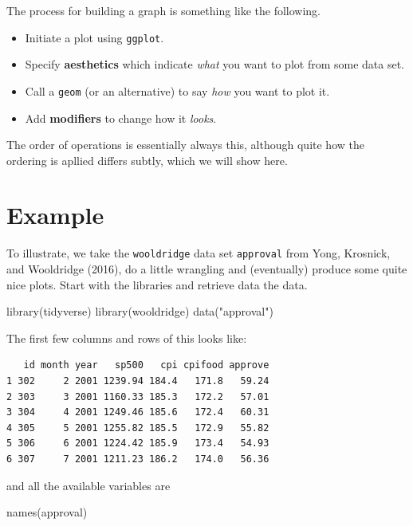 \documentclass[
  letterpaper,
]{book}
\newenvironment{Shaded}{\begin{snugshade}}{\end{snugshade}}
\newcommand{\FunctionTok}[1]{\textcolor[rgb]{0.28,0.35,0.67}{#1}}
\newcommand{\NormalTok}[1]{\textcolor[rgb]{0.00,0.23,0.31}{#1}}
\newcommand{\StringTok}[1]{\textcolor[rgb]{0.13,0.47,0.30}{#1}}
\providecommand{\tightlist}{%
  \setlength{\itemsep}{0pt}\setlength{\parskip}{0pt}}\usepackage{longtable,booktabs,array}
\begin{document}
The process for building a graph is something like the following.

\begin{itemize}
\tightlist
\item
  Initiate a plot using \texttt{ggplot}.
\item
  Specify \textbf{aesthetics} which indicate \emph{what} you want to
  plot from some data set.
\item
  Call a \texttt{geom} (or an alternative) to say \emph{how} you want to
  plot it.
\item
  Add \textbf{modifiers} to change how it \emph{looks}.
\end{itemize}

The order of operations is essentially always this, although quite how
the ordering is apllied differs subtly, which we will show here.

\hypertarget{example}{%
\section{Example}\label{example}}

To illustrate, we take the \texttt{wooldridge} data set
\texttt{approval} from Yong, Krosnick, and Wooldridge (2016), do a
little wrangling and (eventually) produce some quite nice plots. Start
with the libraries and retrieve data the data.

\begin{Shaded}
\begin{Highlighting}[]
\FunctionTok{library}\NormalTok{(tidyverse)}
\FunctionTok{library}\NormalTok{(wooldridge)}
\FunctionTok{data}\NormalTok{(}\StringTok{"approval"}\NormalTok{)}
\end{Highlighting}
\end{Shaded}

The first few columns and rows of this looks like:

\begin{verbatim}
   id month year   sp500   cpi cpifood approve
1 302     2 2001 1239.94 184.4   171.8   59.24
2 303     3 2001 1160.33 185.3   172.2   57.01
3 304     4 2001 1249.46 185.6   172.4   60.31
4 305     5 2001 1255.82 185.5   172.9   55.82
5 306     6 2001 1224.42 185.9   173.4   54.93
6 307     7 2001 1211.23 186.2   174.0   56.36
\end{verbatim}

and all the available variables are

\begin{Shaded}
\begin{Highlighting}[]
\FunctionTok{names}\NormalTok{(approval)}
\end{Highlighting}
\end{Shaded}
\end{document}
